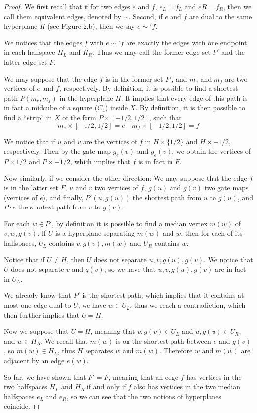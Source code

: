 \documentclass[12pt, a4paper]{article}
\theoremstyle{plain}
\theoremstyle{definition}
\theoremstyle{remark}
\begin{document}
    \begin{proof}
        We first recall that if for two edges $e$ and $f$, $e_{L} = f_{L}$ and $e{R} = f_{R}$, then we call them equivalent edges, denoted by $\sim$. Second, if $e$ and $f$ are dual to the same hyperplane $H$ (see Figure 2.b), then we say $e \sim' f$.
        
        We notices that the edges $f$ with $e \sim' f$ are exactly the edges with one endpoint in each halfspace $H_{L}$ and $H_{R}$. Thus we may call the former edge set $F'$ and the latter edge set $F$.
        
        We may suppose that the edge $f$ is in the former set $F'$, and $m_{e}$ and $m_{f}$ are two vertices of $e$ and $f$, respectively. By definition, it is possible to find a shortest path $P(m_{e}, m_{f})$ in the hyperplane $H$. It implies that every edge of this path is in fact a midcube of a square ($C_{4}$) inside $X$. By definition, it is then possible to find a ``strip'' in $X$ of the form $P \times [-1/2, 1/2]$, such that
        \[ m_{e} \times [-1/2, 1/2] = e \quad m_{f} \times [-1/2, 1/2] = f \]
        
        We notice that if $u$ and $v$ are the vertices of $f$ in $H \times \{ 1/2 \}$ and $H \times { - 1 / 2}$, respectively. Then by the gate map $g_{e}(u)$ and $g_{e}(v)$, we obtain the vertices of $P \times {1/2}$ and $P \times {-1/2}$, which implies that $f$ is in fact in $F$.
        
        Now similarly, if we consider the other direction: We may suppose that the edge $f$ is in the latter set $F$, $u$ and $v$ two vertices of $f$, $g(u)$ and $g(v)$ two gate maps (vertices of $e$), and finally, $P'(u, g(u))$ the shortest path from $u$ to $g(u)$, and $P \cdot e$ the shortest path from $v$ to $g(v)$.
        
        For each $w \in P'$, by definition it is possible to find a median vertex $m(w)$ of $v, w, g(v)$. If $U$ is a hyperplane separating $m(w)$ and $w$, then for each of its halfspaces, $U_{L}$ contains $v, g(v), m(w)$ and $U_{R}$ contains $w$.
        
        Notice that if $U \neq H$, then $U$ does not separate $u, v, g(u), g(v)$. We notice that $U$ does not separate $v$ and $g(v)$, so we have that $u, v, g(u), g(v)$ are in fact in $U_{L}$.
        
        We already know that $P'$ is the shortest path, which implies that it contains at most one edge dual to $U$, we have $w \in U_{L}$, thus we reach a contradiction, which then further implies that $U = H$.
        
        Now we suppose that $U = H$, meaning that $v, g(v) \in U_{L}$ and $u, g(u) \in U_{R}$, and $w \in H_{R}$. We recall that $m(w)$ is on the shortest path between $v$ and $g(v)$, so $m(w) \in H_{L}$, thus $H$ separates $w$ and $m(w)$. Therefore $w$ and $m(w)$ are adjacent by an edge $e(w)$.
        
        So far, we have shown that $F' = F$, meaning that an edge $f$ has vertices in the two halfspaces $H_{L}$ and $H_{R}$ if and only if $f$ also has vertices in the two median halfspaces $e_{L}$ and $e_{R}$, so we can see that the two notions of hyperplanes coincide.
    \end{proof}
    
    \nocite{*}
    
    
    
\end{document}
